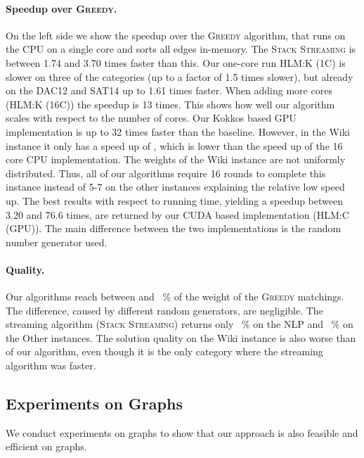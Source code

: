 \documentclass[runningheads]{llncs}
\newcommand{\algoFont}[1]{{\textsc{#1}}\xspace}
\newcommand{\competitorOUR}{\algoFont{HLM:C (GPU)}}
\newcommand{\competitorOURKokkosOneC}{\algoFont{HLM:K (1C)}}
\newcommand{\competitorOURKokkosSixteenC}{\algoFont{HLM:K (16C)}}
\newcommand{\competitorStreaming}{\algoFont{Stack Streaming}}
\newcommand{\competitorGreedy}{\algoFont{Greedy}}
\begin{document}
\paragraph{Speedup over \competitorGreedy.} On the left side we show the speedup over the \competitorGreedy algorithm, that runs on the CPU on a single core and sorts all edges in-memory.
The \competitorStreaming is between 1.74 and 3.70 times faster than this.
Our one-core run \competitorOURKokkosOneC is slower on three of the categories (up to a factor of 1.5 times slower), but already on the \textsf{DAC12} and \textsf{SAT14} up to 1.61 times faster.
When adding more cores (\competitorOURKokkosSixteenC) the speedup is 13 times. 
This shows how well our algorithm scales with respect to the number of cores.
Our Kokkos based GPU implementation  is up to 32 times faster than the baseline.
However, in the Wiki instance it only has a speed up of , which is lower than the speed up of the 16 core CPU implementation. 
The weights of the \textsf{Wiki} instance are not uniformly distributed.
Thus, all of our algorithms require 16 rounds to complete this instance instead of 5-7 on the other instances explaining the relative low speed up.
The best results with respect to running time, yielding a speedup between 3.20 and 76.6 times, are returned by our CUDA based implementation (\competitorOUR).
The main difference between the two implementations is the random number generator used. 


    \vspace{-0.4cm}
\paragraph{Quality.} Our algorithms reach between  and ~\% of the weight of the \competitorGreedy matchings. The difference, caused by different random generators, are negligible.
The streaming algorithm (\competitorStreaming) returns only ~\% on the \textsf{NLP} and ~\% on the \textsf{Other} instances.
The solution quality on the \textsf{Wiki} instance is also worse than of our algorithm, even though it is the only category where the streaming algorithm was faster.
\subsection{Experiments on Graphs}\label{sec:exp:graph}
We conduct experiments on graphs to show that our approach is also feasible and efficient on graphs. 
\end{document}
